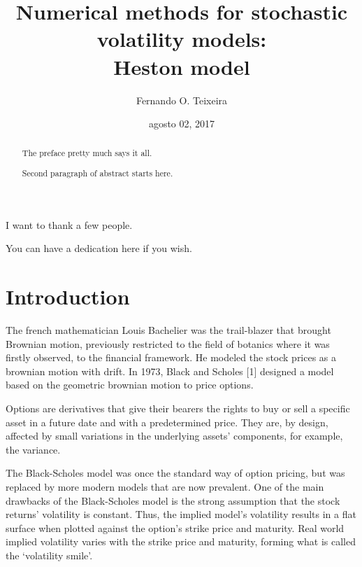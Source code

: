 \documentclass[12pt,twoside]{reedthesis}
\title{\textbf{\Huge{Numerical methods for stochastic volatility models: \\[20pt] Heston model}}}
\author{Fernando O. Teixeira}
\date{agosto 02, 2017}
\theoremstyle{definition}
\theoremstyle{definition}
\theoremstyle{remark}
\begin{document}
      \maketitle
  
  \frontmatter %
  \pagestyle{empty} %
      \begin{acknowledgements}
      I want to thank a few people.
    \end{acknowledgements}
  
      \hypersetup{linkcolor=black}
    \setcounter{tocdepth}{2}
    \tableofcontents
  
      \listoftables
  
      \listoffigures
      \begin{abstract}
      The preface pretty much says it all. \par  Second paragraph of abstract
      starts here.
    \end{abstract}
      \begin{dedication}
      You can have a dedication here if you wish.
    \end{dedication}
  \mainmatter %
  \pagestyle{fancyplain} %

  \chapter{Introduction}\label{intro}
  
  The french mathematician Louis Bachelier was the trail-blazer that
  brought Brownian motion, previously restricted to the field of botanics
  where it was firstly observed, to the financial framework. He modeled
  the stock prices as a brownian motion with drift. In 1973, Black and
  Scholes {[}1{]} designed a model based on the geometric brownian motion
  to price options.
  
  Options are derivatives that give their bearers the rights to buy or
  sell a specific asset in a future date and with a predetermined price.
  They are, by design, affected by small variations in the underlying
  assets' components, for example, the variance.
  
  The Black-Scholes model was once the standard way of option pricing, but
  was replaced by more modern models that are now prevalent. One of the
  main drawbacks of the Black-Scholes model is the strong assumption that
  the stock returns' volatility is constant. Thus, the implied model's
  volatility results in a flat surface when plotted against the option's
  strike price and maturity. Real world implied volatility varies with the
  strike price and maturity, forming what is called the `volatility
  smile'.
  
\end{document}
